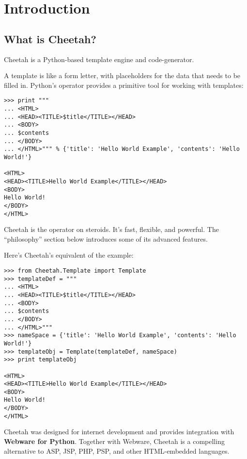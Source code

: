 \section{Introduction}
\label{intro}

\subsection{What is Cheetah?}
\label{intro.whatIs}
Cheetah is a Python-based template engine and code-generator.  

A template is like a form letter, with placeholders for the data that needs to
be filled in.  Python's \code{\%} operator provides a primitive tool for working
with templates:

\begin{verbatim}
>>> print """
... <HTML>
... <HEAD><TITLE>$title</TITLE></HEAD>
... <BODY>
... $contents
... </BODY>
... </HTML>""" % {'title': 'Hello World Example', 'contents': 'Hello World!'}

<HTML>
<HEAD><TITLE>Hello World Example</TITLE></HEAD>
<BODY>
Hello World!
</BODY>
</HTML>
\end{verbatim}

Cheetah is the \code{\%} operator on steroids.  It's fast, flexible, and
powerful.  The ``philosophy'' section below introduces some of its advanced
features. 

Here's Cheetah's equivalent of the example:

\begin{verbatim}
>>> from Cheetah.Template import Template
>>> templateDef = """
... <HTML>
... <HEAD><TITLE>$title</TITLE></HEAD>
... <BODY>
... $contents
... </BODY>
... </HTML>"""
>>> nameSpace = {'title': 'Hello World Example', 'contents': 'Hello World!'}
>>> templateObj = Template(templateDef, nameSpace)
>>> print templateObj
 
<HTML>
<HEAD><TITLE>Hello World Example</TITLE></HEAD>
<BODY>
Hello World!
</BODY>
</HTML>
\end{verbatim}

Cheetah was designed for internet development and provides integration
with {\bf Webware for Python}.  Together with Webware, Cheetah is a compelling
alternative to ASP, JSP, PHP, PSP, and other HTML-embedded languages.

